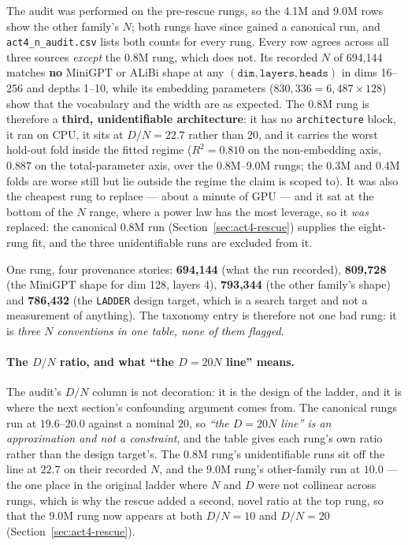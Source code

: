 \documentclass[11pt,a4paper]{article}
\begin{document}
The audit was performed on the pre-rescue rungs, so the 4.1M and 9.0M
rows show the other family's $N$; both rungs have since gained a canonical
run, and \texttt{act4\_n\_audit.csv} lists both counts for every rung.
Every row agrees across all three sources \emph{except} the 0.8M rung, which
does not. Its recorded $N$ of 694,144 matches \textbf{no} MiniGPT or ALiBi
shape at any $(\texttt{dim}, \texttt{layers}, \texttt{heads})$ in dims
16--256 and depths 1--10, while its embedding parameters ($830{,}336 =
6{,}487 \times 128$) show that the vocabulary and the width are as expected.
The 0.8M rung is therefore a \textbf{third, unidentifiable architecture}: it
has no \texttt{architecture} block, it ran on CPU, it sits at $D/N = 22.7$
rather than 20, and it carries the worst hold-out fold inside the fitted
regime ($R^2 = 0.810$ on the non-embedding axis, $0.887$ on the
total-parameter axis, over the 0.8M--9.0M rungs; the 0.3M and 0.4M folds are
worse still but lie outside the regime the claim is scoped to). It was also the
cheapest rung to replace --- about a minute of GPU --- and it sat at the bottom
of the $N$ range, where a power law has the most leverage, so it \emph{was}
replaced: the canonical 0.8M run (Section~\ref{sec:act4-rescue}) supplies the
eight-rung fit, and the three unidentifiable runs are excluded from it.

One rung, four provenance stories: \textbf{694,144} (what the run recorded),
\textbf{809,728} (the MiniGPT shape for dim 128, layers 4), \textbf{793,344}
(the other family's shape) and \textbf{786,432} (the \texttt{LADDER} design
target, which is a search target and not a measurement of anything). The
taxonomy entry is therefore not one bad rung: it is \emph{three $N$
conventions in one table, none of them flagged}. %

\paragraph{The $D/N$ ratio, and what ``the $D = 20N$ line'' means.} The audit's
$D/N$ column is not decoration: it is the design of the ladder, and it is
where the next section's confounding argument comes from. The canonical rungs
run at $19.6$--$20.0$ against a nominal $20$, so \emph{``the
$D = 20N$ line'' is an approximation and not a constraint}, and the table
gives each rung's own ratio rather than the design target's. The
0.8M rung's unidentifiable runs sit off the line at $22.7$ on their recorded
$N$, and the $9.0$M rung's other-family run at $10.0$ --- the one place in the
original ladder where $N$ and $D$ were not collinear across rungs, which is
why the rescue added a second, novel ratio at the top rung, so that the
$9.0$M rung now appears at both $D/N = 10$ and $D/N = 20$
(Section~\ref{sec:act4-rescue}). %
\end{document}
